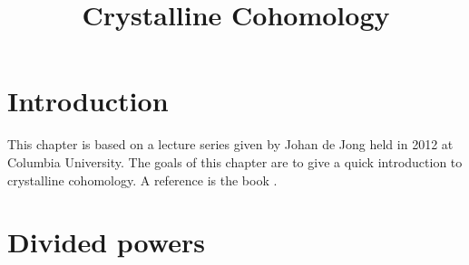 

%


\title{Crystalline Cohomology}


\maketitle

\label{section-phantom}

\tableofcontents



\section{Introduction}
\label{section-introduction}

\noindent
This chapter is based on a lecture series given by Johan de Jong
held in 2012 at Columbia University.
The goals of this chapter are to give a quick introduction to
crystalline cohomology. A reference is the book \cite{Berthelot}.





\section{Divided powers}
\label{section-divided-powers}

